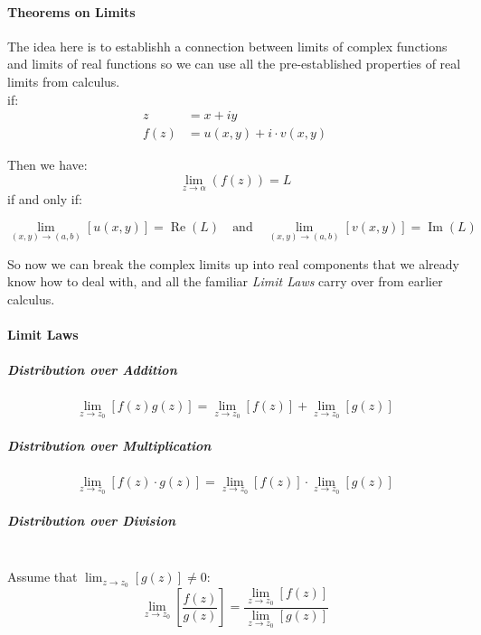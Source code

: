 \documentclass[class=article, crop=false]{standalone}
\begin{document}
\newpage 

\paragraph{Theorems on Limits}
The idea here is to establishh a connection between limits of complex functions and limits of real functions so we can use all the pre-established properties of real limits from calculus. \\


if:
\begin{align*}
z &=  x +  i y \\
f\left( z \right) &=  u\left( x, y \right) +  i \cdot  v \left( x, y  \right)
\end{align*}

Then we have:
\[
  \lim_{z \rightarrow \alpha} \left( f\left( z \right) \right) =  L
\]
if and only if:

\[
  \lim_{\left( x, y \right)     \rightarrow \left( a, b \right) }\left[ u \left( x, y \right)  \right] = \operatorname{Re}\left( L \right) \quad \text{and} \quad \lim_{\left( x, y \right)     \rightarrow \left( a,b \right) }\left[ v\left( x,y \right)  \right] = \operatorname{Im}\left( L \right) 
\]

So now we can break the complex limits up into real components that we already know how to deal with, and all the familiar \textit{Limit Laws} carry over from earlier calculus.

\paragraph{Limit Laws}

\subparagraph{Distribution over Addition}
\[
\lim_{z     \rightarrow z_0}\left[ f \left( z \right) g \left( z \right)  \right] =  \lim_{z     \rightarrow z_0}\left[ f \left( z \right)  \right] + \lim_{z     \rightarrow z_0}\left[ g \left( z \right)  \right] 
\]
\subparagraph{Distribution over Multiplication}
\[
\lim_{z     \rightarrow  z_0}\left[ f \left( z \right) \cdot g \left( z \right)  \right] = \lim_{z     \rightarrow  z_0}\left[ f \left( z \right)  \right] \cdot \lim_{z     \rightarrow  z_0}\left[ g \left( z \right)  \right] 
\]
\subparagraph{Distribution over Division}\ \\
Assume that $\lim_{z     \rightarrow  z_0}\left[ g \left( z \right)  \right] \neq 0$:
\[
  \lim_{z     \rightarrow  z_0}\left[ \frac{f \left( z \right) }{g \left( z \right) } \right] = \frac{\lim_{z     \rightarrow  z_0}\left[ f \left( z \right)  \right] }{\lim_{z     \rightarrow  z_0}\left[ g \left( z \right)  \right] }
\]
\end{document}
